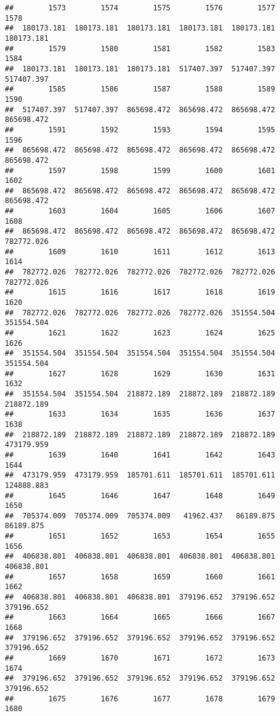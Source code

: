 \documentclass[
]{book}
\begin{document}
\begin{verbatim}
##        1573        1574        1575        1576        1577        1578 
##  180173.181  180173.181  180173.181  180173.181  180173.181  180173.181 
##        1579        1580        1581        1582        1583        1584 
##  180173.181  180173.181  180173.181  517407.397  517407.397  517407.397 
##        1585        1586        1587        1588        1589        1590 
##  517407.397  517407.397  865698.472  865698.472  865698.472  865698.472 
##        1591        1592        1593        1594        1595        1596 
##  865698.472  865698.472  865698.472  865698.472  865698.472  865698.472 
##        1597        1598        1599        1600        1601        1602 
##  865698.472  865698.472  865698.472  865698.472  865698.472  865698.472 
##        1603        1604        1605        1606        1607        1608 
##  865698.472  865698.472  865698.472  865698.472  865698.472  782772.026 
##        1609        1610        1611        1612        1613        1614 
##  782772.026  782772.026  782772.026  782772.026  782772.026  782772.026 
##        1615        1616        1617        1618        1619        1620 
##  782772.026  782772.026  782772.026  782772.026  351554.504  351554.504 
##        1621        1622        1623        1624        1625        1626 
##  351554.504  351554.504  351554.504  351554.504  351554.504  351554.504 
##        1627        1628        1629        1630        1631        1632 
##  351554.504  351554.504  218872.189  218872.189  218872.189  218872.189 
##        1633        1634        1635        1636        1637        1638 
##  218872.189  218872.189  218872.189  218872.189  218872.189  473179.959 
##        1639        1640        1641        1642        1643        1644 
##  473179.959  473179.959  185701.611  185701.611  185701.611  124888.883 
##        1645        1646        1647        1648        1649        1650 
##  705374.009  705374.009  705374.009   41962.437   86189.875   86189.875 
##        1651        1652        1653        1654        1655        1656 
##  406838.801  406838.801  406838.801  406838.801  406838.801  406838.801 
##        1657        1658        1659        1660        1661        1662 
##  406838.801  406838.801  406838.801  379196.652  379196.652  379196.652 
##        1663        1664        1665        1666        1667        1668 
##  379196.652  379196.652  379196.652  379196.652  379196.652  379196.652 
##        1669        1670        1671        1672        1673        1674 
##  379196.652  379196.652  379196.652  379196.652  379196.652  379196.652 
##        1675        1676        1677        1678        1679        1680 

\end{verbatim}
\end{document}
